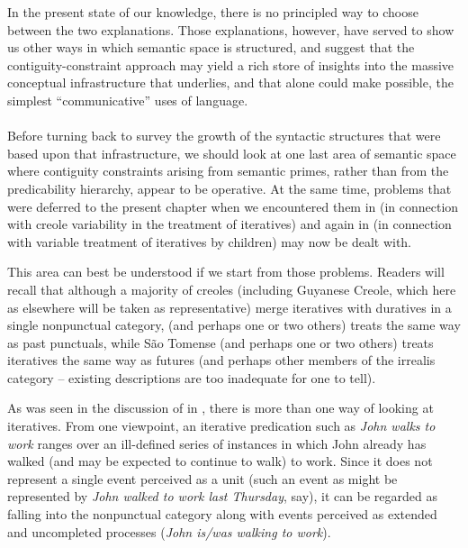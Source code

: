 In the present state of our knowledge, there is no principled way to choose between the two explanations. Those explanations, however, have served to show us other ways in which semantic space is struc\-tured, and suggest that the contiguity-constraint approach may yield a rich store of insights into the massive conceptual infrastructure that underlies, and that alone could make possible, the simplest ``communi\-cative'' uses of language.\\\\

Before turning back to survey the growth of the syntactic struc\-tures that were based upon that infrastructure, we should look at one last area of semantic space where contiguity constraints arising from semantic primes, rather than from the predicability hierarchy, appear to be operative. At the same time, problems that were deferred to the present chapter when we encountered them in  (in connection with creole variability in the treatment of iteratives) and again in  (in connection with variable treatment of iteratives by children) may now be dealt with.

This area can best be understood if we start from those problems. Readers will recall that although a majority of creoles (including Guyanese Creole, which here as elsewhere will be taken as representative) merge iteratives with duratives in a single nonpunctual category,
 (and perhaps one or two others) treats  the same way as past punctuals, while S{\~a}o Tomense (and perhaps one or two others) treats iteratives the same way as futures (and perhaps other members of the irrealis category -- existing descriptions are too inadequate for one to tell).

As was seen in the discussion of \citet{BrockartEtAl1973} in , there is more than one way of looking at iteratives. From one viewpoint, an iterative predication such as \textit{John walks to work} ranges over an ill-defined series of instances in which John already has walked (and may be expected to continue to walk) to work. Since it does not represent a single event perceived as a unit (such an event as might be represented by \textit{John walked to work last Thursday}, say), it can be regarded as falling into the nonpunctual category along with events perceived as extended and uncompleted processes (\textit{John is/was walking to work}).

